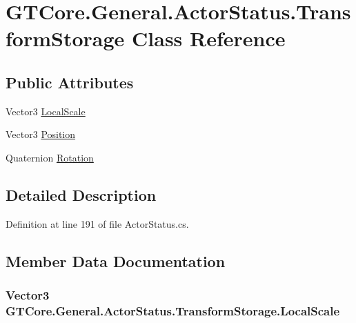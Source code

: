 \hypertarget{class_g_t_core_1_1_general_1_1_actor_status_1_1_transform_storage}{}\section{G\+T\+Core.\+General.\+Actor\+Status.\+Transform\+Storage Class Reference}
\label{class_g_t_core_1_1_general_1_1_actor_status_1_1_transform_storage}
\subsection*{Public Attributes}
\begin{DoxyCompactItemize}
\item 
Vector3 \hyperlink{class_g_t_core_1_1_general_1_1_actor_status_1_1_transform_storage_a45165cf14d2e4221ef59b54602494450}{Local\+Scale}
\item 
Vector3 \hyperlink{class_g_t_core_1_1_general_1_1_actor_status_1_1_transform_storage_a50f0fde9da25ebe17969c0bcc374c5f4}{Position}
\item 
Quaternion \hyperlink{class_g_t_core_1_1_general_1_1_actor_status_1_1_transform_storage_a6ad17f8ccac52b615f4124d8e3c7b09a}{Rotation}
\end{DoxyCompactItemize}


\subsection{Detailed Description}


Definition at line 191 of file Actor\+Status.\+cs.



\subsection{Member Data Documentation}
\hypertarget{class_g_t_core_1_1_general_1_1_actor_status_1_1_transform_storage_a45165cf14d2e4221ef59b54602494450}{}
\subsubsection[{Local\+Scale}]{\setlength{\rightskip}{0pt plus 5cm}Vector3 G\+T\+Core.\+General.\+Actor\+Status.\+Transform\+Storage.\+Local\+Scale}\label{class_g_t_core_1_1_general_1_1_actor_status_1_1_transform_storage_a45165cf14d2e4221ef59b54602494450}


